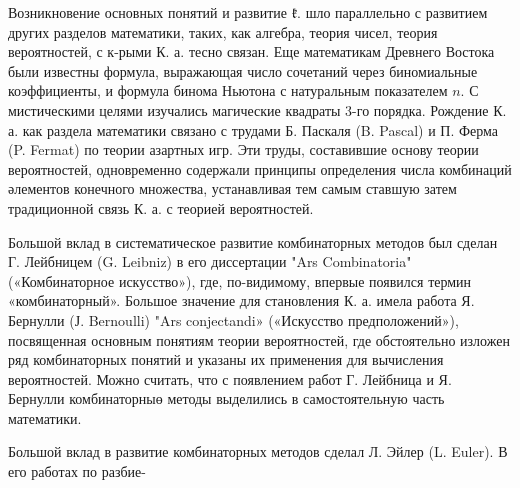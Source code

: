 \documentclass[10pt]{article}
\begin{document}
Возникновение основных понятий и развитие $\mathfrak{k}$. шло параллельно с развитием других разделов математики, таких, как алгебра, теория чисел, теория вероятностей, с к-рыми К. а. тесно связан. Еще математикам Древнего Востока были известны формула, выражающая число сочетаний через биномиальные коэффициенты, и формула бинома Ньютона с натуральным показателем $n$. С мистическими целями изучались магические квадраты 3-го порядка. Рождение К. а. как раздела математики связано с трудами Б. Паскаля (B. Pascal) и П. Ферма (P. Fermat) по теории азартных игр. Эти труды, составившие основу теории вероятностей, одновременно содержали принципы определения числа комбинаций әлементов конечного множества, устанавливая тем самым ставшую затем традиционной связь К. а. с теорией вероятностей.



Большой вклад в систематическое развитие комбинаторных методов был сделан Г. Лейбницем (G. Leibniz) в его диссертации "Ars Combinatoria" («Комбинаторное искусство»), где, по-видимому, впервые появился термин «комбинаторный». Большое значение для становления К. а. имела работа Я. Бернулли (Ј. Bernoulli) "Ars conjectandi» («Искусство предположений»), посвященная основным понятиям теории вероятностей, где обстоятельно изложен ряд комбинаторных понятий и указаны их применения для вычисления вероятностей. Можно считать, что с появлением работ Г. Лейбница и Я. Бернулли комбинаторныө методы выделились в самостоятельную часть математики.



Большой вклад в развитие комбинаторных методов сделал Л. Эйлер (L. Euler). В его работах по разбие-
\end{document}
